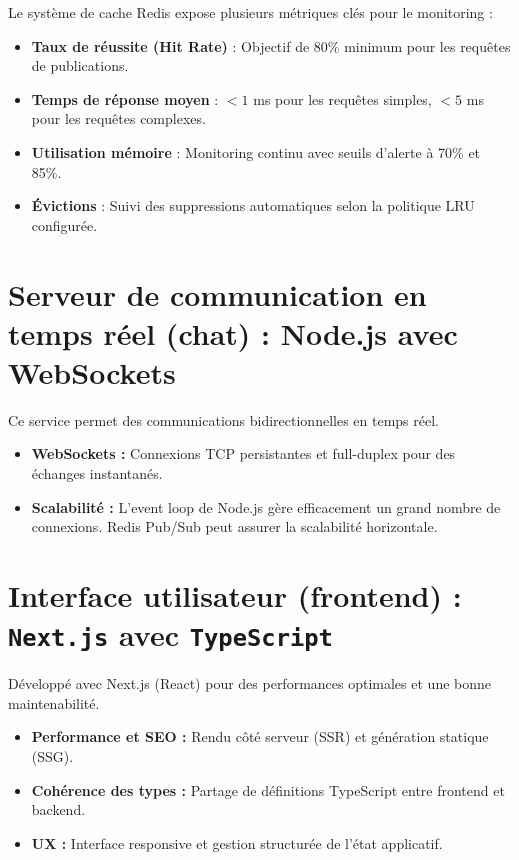 \documentclass{rapportPfe}
\begin{document}
Le système de cache Redis expose plusieurs métriques clés pour le monitoring :

\begin{itemize}
    \item \textbf{Taux de réussite (Hit Rate)} : Objectif de 80\% minimum pour les requêtes de publications.
    \item \textbf{Temps de réponse moyen} : $< 1$ ms pour les requêtes simples, $< 5$ ms pour les requêtes complexes.
    \item \textbf{Utilisation mémoire} : Monitoring continu avec seuils d'alerte à 70\% et 85\%.
    \item \textbf{Évictions} : Suivi des suppressions automatiques selon la politique LRU configurée.
\end{itemize}

\section{Serveur de communication en temps réel (chat) : Node.js avec WebSockets}

Ce service permet des communications bidirectionnelles en temps réel.

\begin{itemize}
    \item \textbf{WebSockets :} Connexions TCP persistantes et full-duplex pour des échanges instantanés.
    \item \textbf{Scalabilité :} L’event loop de Node.js gère efficacement un grand nombre de connexions. Redis Pub/Sub peut assurer la scalabilité horizontale.
\end{itemize}

\section{Interface utilisateur (frontend) : \texttt{Next.js} avec \texttt{TypeScript}}

Développé avec Next.js (React) pour des performances optimales et une bonne maintenabilité.

\begin{itemize}
    \item \textbf{Performance et SEO :} Rendu côté serveur (SSR) et génération statique (SSG).
    \item \textbf{Cohérence des types :} Partage de définitions TypeScript entre frontend et backend.
    \item \textbf{UX :} Interface responsive et gestion structurée de l’état applicatif.
\end{itemize}
\end{document}
